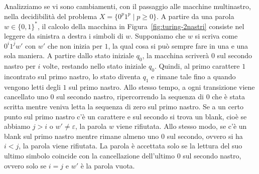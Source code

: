 \begin{exam}
Analizziamo se vi sono cambiamenti, con il passaggio alle macchine multinastro, nella decidibilità del problema $X=\{0^p1^p\mid p\geq 0\}$.
A partire da una parola $w\in\{0,1\}^*$, il calcolo della macchina in Figura~\ref{fig:turing-2nastri} consiste nel leggere da sinistra a destra i simboli di $w$. Supponiamo che $w$ si scriva come $0^i1^jw'$ con $w'$ che non inizia per $1$, la qual cosa si può sempre fare in una e una sola maniera.
A partire dallo stato iniziale $q_0$, la macchina scriverà $0$ sul secondo nastro per $i$ volte, restando nello stato iniziale $q_0$. Quindi, al primo carattere $1$ incontrato sul primo nastro, lo stato diventa $q_1$ e rimane tale fino a quando vengono letti degli $1$ sul primo nastro. Allo stesso tempo, a ogni transizione viene cancellato uno $0$ sul secondo nastro, ripercorrendo la sequenza di $0$ che è stata scritta mentre veniva letta la sequenza di zero sul primo nastro.
Se a un certo punto sul primo nastro c'è un carattere e sul secondo si trova un blank, cioè se abbiamo $j>i$ o $w'\neq\varepsilon$, la parola $w$ viene rifiutata. Allo stesso modo, se c'è un blank sul primo nastro mentre rimane almeno uno $0$ sul secondo, ovvero si ha $i<j$, la parola viene rifiutata. La parola è accettata solo se la lettura del suo ultimo simbolo coincide con la cancellazione dell'ultimo $0$ sul secondo nastro, ovvero solo se $i=j$ e $w'$ è la parola vuota.

\begin{figure}[H]
\centering
{}
\end{figure}
\end{exam}
